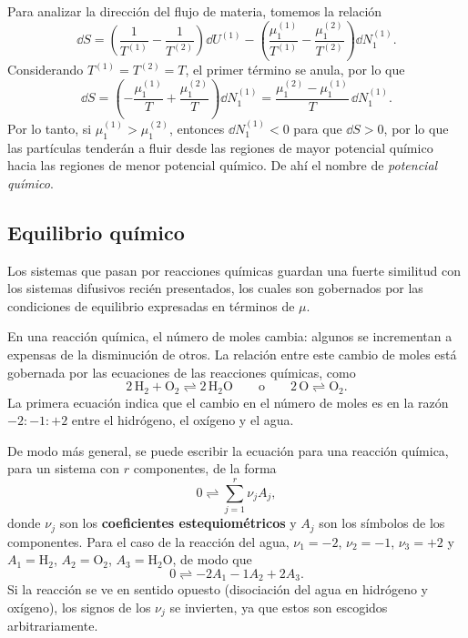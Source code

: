 Para analizar la dirección del flujo de materia, tomemos la relación
\begin{equation*}
  \dd S=\left(\frac{1}{T^{(1)}}-\frac{1}{T^{(2)}}\right)\dd U^{(1)}-\left(\frac{\mu_1^{(1)}}{T^{(1)}}-\frac{\mu_1^{(2)}}{T^{(2)}}\right)\dd N_1^{(1)}.
\end{equation*}
Considerando $T^{(1)}=T^{(2)}=T$, el primer término se anula, por lo que
\begin{equation*}
  \dd S=\left(-\frac{\mu_1^{(1)}}{T}+\frac{\mu_1^{(2)}}{T}\right)\dd N_1^{(1)}=\frac{\mu_1^{(2)}-\mu_1^{(1)}}{T}\,\dd N_1^{(1)}.
\end{equation*}
Por lo tanto, si $\mu_1^{(1)}>\mu_1^{(2)}$, entonces $\dd N_1^{(1)}<0$ para que $\dd S>0$, por lo que
las partículas tenderán a fluir desde las regiones de mayor potencial químico hacia las regiones de
menor potencial químico. De ahí el nombre de \emph{potencial químico}.

\subsection*{Equilibrio químico}

Los sistemas que pasan por reacciones químicas guardan una fuerte similitud con los sistemas
difusivos recién presentados, los cuales son gobernados por las condiciones de equilibrio
expresadas en términos de $\mu$.

En una reacción química, el número de moles cambia: algunos se incrementan a expensas de la
disminución de otros. La relación entre este cambio de moles está gobernada por las ecuaciones de
las reacciones químicas, como
\begin{equation*}
  2\,\mathrm{H_2}+\mathrm{O_2}\rightleftharpoons2\,\mathrm{H_2O}
  \qquad\text{o}\qquad
  2\,\mathrm{O}\rightleftharpoons\mathrm{O_2}.
\end{equation*}
La primera ecuación indica que el cambio en el número de moles es en la razón $-2:-1:+2$ entre el
hidrógeno, el oxígeno y el agua.

De modo más general, se puede escribir la ecuación para una reacción química, para un sistema con
$r$ componentes, de la forma
\begin{equation*}
  0\rightleftharpoons\sum_{j=1}^{r}\nu_j A_j,
\end{equation*}
donde $\nu_j$ son los \textbf{coeficientes estequiométricos} y $A_j$ son los símbolos de los
componentes. Para el caso de la reacción del agua,
$\nu_1=-2$, $\nu_2=-1$, $\nu_3=+2$ y $A_1=\mathrm{H_2}$, $A_2=\mathrm{O_2}$, $A_3=\mathrm{H_2O}$, de
modo que
\begin{equation*}
  0\rightleftharpoons-2A_1-1A_2+2A_3.
\end{equation*}
Si la reacción se ve en sentido opuesto (disociación del agua en hidrógeno y oxígeno), los signos de
los $\nu_j$ se invierten, ya que estos son escogidos arbitrariamente.

